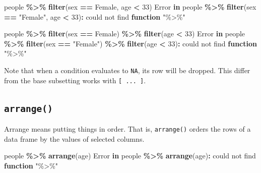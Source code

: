 \documentclass[
]{book}
\newenvironment{Shaded}{\begin{snugshade}}{\end{snugshade}}
\newcommand{\ControlFlowTok}[1]{\textcolor[rgb]{0.13,0.29,0.53}{\textbf{#1}}}
\newcommand{\DecValTok}[1]{\textcolor[rgb]{0.00,0.00,0.81}{#1}}
\newcommand{\FunctionTok}[1]{\textcolor[rgb]{0.13,0.29,0.53}{\textbf{#1}}}
\newcommand{\NormalTok}[1]{#1}
\newcommand{\SpecialCharTok}[1]{\textcolor[rgb]{0.81,0.36,0.00}{\textbf{#1}}}
\newcommand{\StringTok}[1]{\textcolor[rgb]{0.31,0.60,0.02}{#1}}
\begin{document}
\begin{Shaded}
\begin{Highlighting}[]
\NormalTok{people }\SpecialCharTok{\%\textgreater{}\%} \FunctionTok{filter}\NormalTok{(sex }\SpecialCharTok{==} \StringTok{\textquotesingle{}Female\textquotesingle{}}\NormalTok{, age }\SpecialCharTok{\textless{}} \DecValTok{33}\NormalTok{)}
\NormalTok{Error }\ControlFlowTok{in}\NormalTok{ people }\SpecialCharTok{\%\textgreater{}\%} \FunctionTok{filter}\NormalTok{(sex }\SpecialCharTok{==} \StringTok{"Female"}\NormalTok{, age }\SpecialCharTok{\textless{}} \DecValTok{33}\NormalTok{)}\SpecialCharTok{:}\NormalTok{ could not find }\ControlFlowTok{function} \StringTok{"\%\textgreater{}\%"}
\end{Highlighting}
\end{Shaded}

\begin{Shaded}
\begin{Highlighting}[]
\NormalTok{people }\SpecialCharTok{\%\textgreater{}\%} \FunctionTok{filter}\NormalTok{(sex }\SpecialCharTok{==} \StringTok{\textquotesingle{}Female\textquotesingle{}}\NormalTok{) }\SpecialCharTok{\%\textgreater{}\%} \FunctionTok{filter}\NormalTok{(age }\SpecialCharTok{\textless{}} \DecValTok{33}\NormalTok{)}
\NormalTok{Error }\ControlFlowTok{in}\NormalTok{ people }\SpecialCharTok{\%\textgreater{}\%} \FunctionTok{filter}\NormalTok{(sex }\SpecialCharTok{==} \StringTok{"Female"}\NormalTok{) }\SpecialCharTok{\%\textgreater{}\%} \FunctionTok{filter}\NormalTok{(age }\SpecialCharTok{\textless{}} \DecValTok{33}\NormalTok{)}\SpecialCharTok{:}\NormalTok{ could not find }\ControlFlowTok{function} \StringTok{"\%\textgreater{}\%"}
\end{Highlighting}
\end{Shaded}

Note that when a condition evaluates to \texttt{NA}, its row will be dropped. This differ from the base subsetting works with \texttt{{[}\ ...\ {]}}.

\subsection*{\texorpdfstring{\texttt{arrange()}}{arrange()}}\label{arrange}

Arrange means putting things in order. That is, \texttt{arrange()} orders the rows of a data frame by the values of selected columns.

\begin{Shaded}
\begin{Highlighting}[]
\NormalTok{people }\SpecialCharTok{\%\textgreater{}\%} \FunctionTok{arrange}\NormalTok{(age)}
\NormalTok{Error }\ControlFlowTok{in}\NormalTok{ people }\SpecialCharTok{\%\textgreater{}\%} \FunctionTok{arrange}\NormalTok{(age)}\SpecialCharTok{:}\NormalTok{ could not find }\ControlFlowTok{function} \StringTok{"\%\textgreater{}\%"}
\end{Highlighting}
\end{Shaded}
\end{document}
